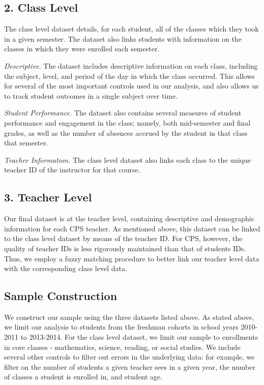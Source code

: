 \documentclass{article}\usepackage{knitr}
\begin{document}
\subsection{2. Class Level}

The class level dataset details, for each student, all of the classes which they took in a given semester. The dataset also links students with information on the classes in which they were enrolled each semester. 

\textit{Descriptive.} The dataset includes descriptive information on each class, including the subject, level, and period of the day in which the class occurred. This allows for several of the most important controls used in our analysis, and also allows us to track student outcomes in a single subject over time. 

\textit{Student Performance.} The dataset also contains several measures of student performance and engagement in the class; namely, both mid-semester and final grades, as well as the number of absences accrued by the student in that class that semester. 

\textit{Teacher Information.} The class level dataset also links each class to the unique teacher ID of the instructor for that course. 

\subsection{3. Teacher Level} 

Our final dataset is at the teacher level, containing descriptive and demographic information for each CPS teacher. As mentioned above, this dataset can be linked to the class level dataset by means of the teacher ID. For CPS, however, the quality of teacher IDs is less rigorously maintained than that of students IDs. Thus, we employ a fuzzy matching procedure to better link our teacher level data with the corresponding class level data. 

\subsection{Sample Construction}

We construct our sample using the three datasets listed above. As stated above, we limit our analysis to students from the freshman cohorts in school years 2010-2011 to 2013-2014. For the class level dataset, we limit our sample to enrollments in core classes - mathematics, science, reading, or social studies. We include several other controls to filter out errors in the underlying data: for example, we filter on the number of students a given teacher sees in a given year, the number of classes a student is enrolled in, and student age. 
\end{document}
